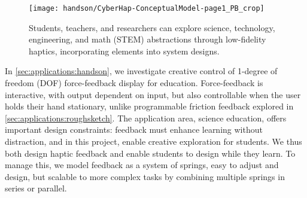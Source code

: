\begin{figure} [bt]
  \centering
  \texttt{[image: handson/CyberHap-ConceptualModel-page1\_PB\_crop]}
  \caption{Students, teachers, and researchers can explore science, technology, engineering, and math (STEM) abstractions through low-fidelity haptics, incorporating elements into system designs.}
  \label{fig:conceptOverview}
\end{figure}

In \autoref{sec:applications:handson}, we investigate creative control of 1-degree of freedom (DOF) force-feedback display for education.
Force-feedback is interactive, with output dependent on input, but also controllable when the user holds their hand stationary, unlike programmable friction feedback explored in \autoref{sec:applications:roughsketch}.
The application area, science education, offers important design constraints: feedback must enhance learning without distraction, and in this project, enable creative exploration for students.
We thus both design haptic feedback and enable students to design while they learn.
To manage this, we model feedback as a system of springs, easy to adjust and design, but scalable to more complex tasks by combining multiple springs in series or parallel.


%



